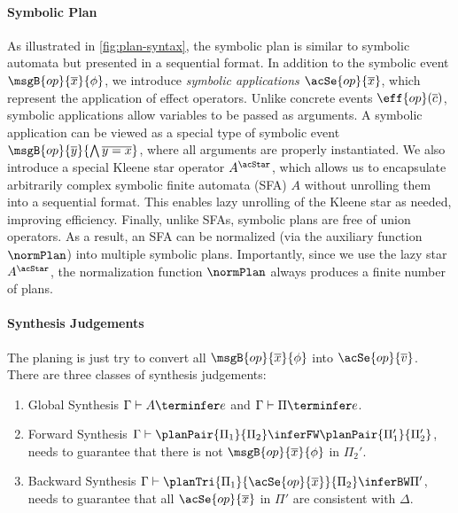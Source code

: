 \paragraph{Symbolic Plan} As illustrated in \autoref{fig:plan-syntax}, the symbolic plan is similar to symbolic automata but presented in a sequential format. In addition to the symbolic event $\msgB{op}{\overline{x}}{\phi}$, we introduce \emph{symbolic applications} $\acSe{op}{\overline{x}}$, which represent the application of effect operators. Unlike concrete events $\eff{op}(\overline{c})$, symbolic applications allow variables to be passed as arguments. A symbolic application can be viewed as a special type of symbolic event $\msgB{op}{\overline{y}}{\bigwedge \overline{y = x}}$, where all arguments are properly instantiated. We also introduce a special Kleene star operator $A^\acStar$, which allows us to encapsulate arbitrarily complex symbolic finite automata (SFA) $A$ without unrolling them into a sequential format. This enables lazy unrolling of the Kleene star as needed, improving efficiency.  Finally, unlike SFAs, symbolic plans are free of union operators. As a result, an SFA can be normalized (via the auxiliary function $\normPlan$) into multiple symbolic plans. Importantly, since we use the lazy star $A^\acStar$, the normalization function $\normPlan$ always produces a finite number of plans.

\paragraph{Synthesis Judgements} The planing is just try to convert all $\msgB{op}{\overline{x}}{\phi}$ into $\acSe{op}{\overline{v}}$. There are three classes of synthesis judgements:
\begin{enumerate}
    \item Global Synthesis $\Gamma \vdash A \terminfer e$ and $\Gamma \vdash \Pi \terminfer e$.
    \item Forward Synthesis $\Gamma \vdash \planPair{\Pi_1}{\Pi_2} \inferFW \planPair{\Pi_1'}{\Pi_2'}$, needs to guarantee that there is not $\msgB{op}{\overline{x}}{\phi}$ in $\Pi_2'$.
    \item Backward Synthesis $\Gamma \vdash \planTri{\Pi_1}{\acSe{op}{\overline{x}}}{\Pi_2} \inferBW \Pi'$, needs to guarantee that all $\acSe{op}{\overline{x}}$ in $\Pi'$ are consistent with $\Delta$.
\end{enumerate}

